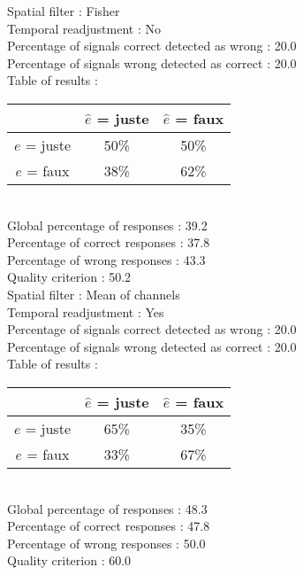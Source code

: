 Spatial filter : Fisher \\
Temporal readjustment : No \\
Percentage of signals correct detected as wrong :   20.0 \\
Percentage of signals wrong detected as correct :   20.0 \\
Table of results : \\
\begin{tabular}{|c|c|c|}
\hline				& $\hat{e}$ = juste & $\hat{e}$ = faux \\
\hline  $e$ = juste	&     50\%			&     50\%		\\
\hline  $e$ = faux	&     38\%			&     62\%		\\
\hline
\end{tabular}\\
Global percentage of responses :   39.2 \\
Percentage of correct responses :   37.8 \\
Percentage of wrong responses :   43.3 \\
Quality criterion :   50.2 \\

Spatial filter : Mean of channels \\
Temporal readjustment : Yes \\
Percentage of signals correct detected as wrong :   20.0 \\
Percentage of signals wrong detected as correct :   20.0 \\
Table of results : \\
\begin{tabular}{|c|c|c|}
\hline				& $\hat{e}$ = juste & $\hat{e}$ = faux \\
\hline  $e$ = juste	&     65\%			&     35\%		\\
\hline  $e$ = faux	&     33\%			&     67\%		\\
\hline
\end{tabular}\\
Global percentage of responses :   48.3 \\
Percentage of correct responses :   47.8 \\
Percentage of wrong responses :   50.0 \\
Quality criterion :   60.0 \\

